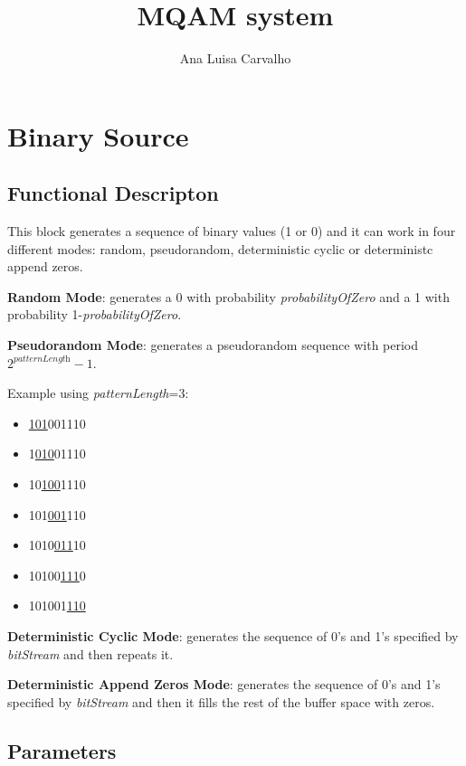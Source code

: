 \documentclass[a4paper]{article}
\title{MQAM system}
\author{Ana Luisa Carvalho}
\begin{document}
\maketitle

\section{Binary Source}

\subsection*{Functional Descripton}

This block generates a sequence of binary values (1 or 0) and it can work in four different modes: random, pseudorandom, deterministic cyclic or deterministc append zeros.

\textbf{Random Mode}:
generates a 0 with probability \textit{probabilityOfZero} and a 1 with probability 1-\textit{probabilityOfZero}.

\textbf{Pseudorandom Mode}:
generates a pseudorandom sequence with period $2^\textit{patternLength}-1$.

Example using \textit{patternLength}=3:
\begin{multicols}{3}
	\begin{itemize}
		\item[] \underline{101}001110
		\item[] 1\underline{010}01110
		\item[] 10\underline{100}1110
		\item[] 101\underline{001}110
		\item[] 1010\underline{011}10
		\item[] 10100\underline{111}0
		\item[] 101001\underline{110}
	\end{itemize}
\end{multicols}

\textbf{Deterministic Cyclic Mode}:
generates the sequence of 0's and 1's specified by \textit{bitStream} and then repeats it.

\textbf{Deterministic Append Zeros Mode}:
generates the sequence of 0's and 1's specified by \textit{bitStream} and then it fills the rest of the buffer space with zeros.

\subsection*{Parameters}
\end{document}
